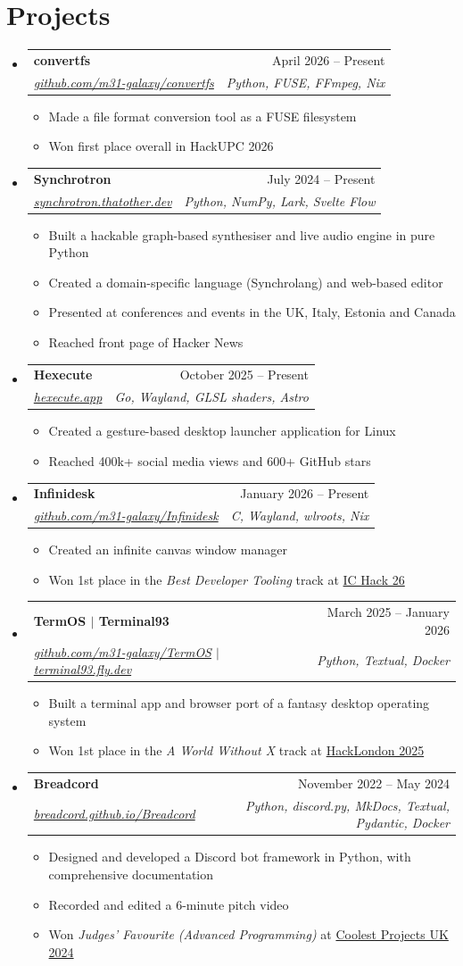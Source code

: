 \documentclass[letterpaper,11pt]{article}
\makeatletter
\newcommand{\resumeItem}[1]{
  \item\small{
    {#1 \vspace{-2pt}}
  }
}
\newcommand{\resumeSubheading}[4]{
  \vspace{-2pt}\item
    \begin{tabular*}{0.97\textwidth}[t]{l@{\extracolsep{\fill}}r}
      \textbf{#1} & #2 \\
      \textit{\small#3} & \textit{\small #4} \\
    \end{tabular*}\vspace{-7pt}
}
\newcommand{\resumeSubHeadingListStart}{\begin{itemize}[leftmargin=0.15in, label={}]}
\newcommand{\resumeSubHeadingListEnd}{\end{itemize}}
\newcommand{\resumeItemListStart}{\begin{itemize}}
\newcommand{\resumeItemListEnd}{\end{itemize}\vspace{-5pt}}
\makeatother
\begin{document}
\section{Projects}
    \resumeSubHeadingListStart
      \resumeSubheading
          {convertfs}{April 2026 -- Present}
          {\href{https://github.com/m31-galaxy/convertfs}{github.com/m31-galaxy/convertfs}}{Python, FUSE, FFmpeg, Nix}
          \resumeItemListStart
            \resumeItem{Made a file format conversion tool as a FUSE filesystem}
            \resumeItem{Won first place overall in HackUPC 2026}
          \resumeItemListEnd
      \resumeSubheading
          {Synchrotron}{July 2024 -- Present}
          {\href{https://synchrotron.thatother.dev}{synchrotron.thatother.dev}}{Python, NumPy, Lark, Svelte Flow}
          \resumeItemListStart
            \resumeItem{Built a hackable graph-based synthesiser and live audio engine in pure Python}
            \resumeItem{Created a domain-specific language (Synchrolang) and web-based editor}
            \resumeItem{Presented at conferences and events in the UK, Italy, Estonia and Canada}
            \resumeItem{Reached front page of Hacker News}
          \resumeItemListEnd
      \resumeSubheading
          {Hexecute}{October 2025 -- Present}
          {\href{https://hexecute.app}{hexecute.app}}{Go, Wayland, GLSL shaders, Astro}
          \resumeItemListStart
            \resumeItem{Created a gesture-based desktop launcher application for Linux}
            \resumeItem{Reached 400k+ social media views and 600+ GitHub stars}
          \resumeItemListEnd
      \resumeSubheading
          {Infinidesk}{January 2026 -- Present}
          {\href{https://github.com/m31-galaxy/Infinidesk}{github.com/m31-galaxy/Infinidesk}}{C, Wayland, wlroots, Nix}
          \resumeItemListStart
            \resumeItem{Created an infinite canvas window manager}
            \resumeItem{Won 1st place in the \emph{Best Developer Tooling} track at \href{https://ic-hack-26.devpost.com/}{IC Hack 26}}
          \resumeItemListEnd
      \resumeSubheading
          {TermOS $|$ Terminal93}{March 2025 -- January 2026}
          {\href{https://github.com/m31-galaxy/TermOS}{github.com/m31-galaxy/TermOS} $|$ \href{https://terminal93.fly.dev}{terminal93.fly.dev}}{Python, Textual, Docker}
          \resumeItemListStart
            \resumeItem{Built a terminal app and browser port of a fantasy desktop operating system}
            \resumeItem{Won 1st place in the \emph{A World Without X} track at \href{https://www.huzzle.com/events/hacklondon-2025-884200}{HackLondon 2025}}
          \resumeItemListEnd
      \resumeSubheading
          {Breadcord}{November 2022 -- May 2024}
          {\href{https://breadcord.github.io/Breadcord}{breadcord.github.io/Breadcord}}{Python, discord.py, MkDocs, Textual, Pydantic, Docker}
          \resumeItemListStart
            \resumeItem{Designed and developed a Discord bot framework in Python, with comprehensive documentation}
            \resumeItem{Recorded and edited a 6-minute pitch video}
            \resumeItem{Won \emph{Judges' Favourite (Advanced Programming)} at \href{https://online.coolestprojects.org/}{Coolest Projects UK 2024}}
          \resumeItemListEnd
    \resumeSubHeadingListEnd
\end{document}
